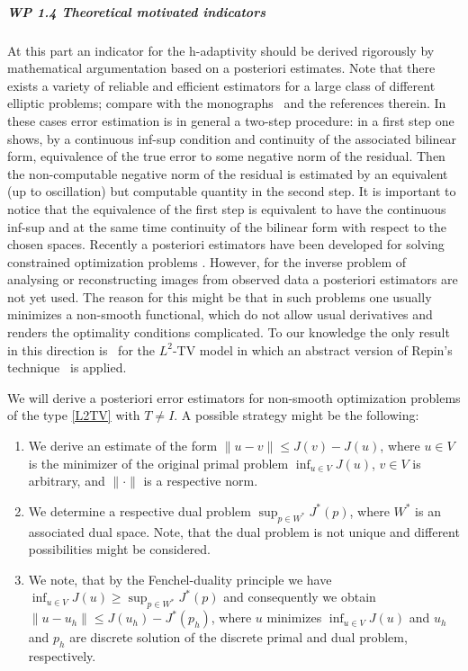 \documentclass[enabledeprecatedfontcommands,cleardoublepage=empty,headsepline,twoside,11pt,DIV=15,BCOR=12mm,final]{scrartcl}
\begin{document}
 
 \subparagraph{WP 1.4 Theoretical motivated indicators}
 
  At this part an indicator for the h-adaptivity should be derived rigorously by mathematical argumentation based on a posteriori estimates. Note that there exists a variety of reliable and efficient estimators for a large class of different elliptic problems; compare with the monographs~\cite{AinOde,Ciarlet:02,Verfurth:96} and the references therein. In these cases error estimation is in general a two-step procedure: in a first step one shows, by a continuous inf-sup condition and continuity of the associated bilinear form, equivalence of the true error to some negative norm of the residual. Then the non-computable negative norm of the residual is estimated by an equivalent (up to oscillation) but computable quantity in the second step. It is important to notice that the equivalence of the first step is equivalent to have the continuous inf-sup and at the same time continuity of the bilinear form with respect to the chosen spaces. Recently a posteriori estimators have been developed for solving constrained optimization problems \cite{KoRoSi:14}. However, for the inverse problem of analysing or reconstructing images from observed data a posteriori estimators are not yet used. The reason for this might be that in such problems one usually minimizes a non-smooth functional, which do not allow usual derivatives and renders the optimality conditions complicated. To our knowledge the only result in this direction is~\cite{Bar2015} for the $L^2$-TV model in which an abstract version of Repin's technique~\cite{Repin} is applied.
 
 We will derive a posteriori error estimators for non-smooth optimization problems of the type \eqref{L2TV} with $T\not= I$. A possible strategy might be the following: 
\begin{enumerate}[1.]
\item We derive an estimate of the form $\|u -v \| \leq J(v) - J(u)$, where $u\in V$ is the minimizer of the original primal problem $\inf_{u\in V} J(u)$, $v\in V$ is arbitrary, and $\|\cdot\|$ is a respective norm.
\item We determine a respective dual problem $\sup_{p\in W^*} J^*(p)$, where $W^*$ is an associated dual space. Note, that the dual problem is not unique and different possibilities might be considered. %
\item We note, that by the Fenchel-duality principle we have $\inf_{u\in V} J(u)\geq \sup_{p\in W^*} J^*(p)$ and consequently we obtain $\|u -u_h \| \leq J(u_h) - J^*(p_h)$, where $u$ minimizes  $\inf_{u\in V} J(u)$ and $u_h$ and $p_h$ are discrete solution of the discrete primal and dual problem, respectively. 
\end{enumerate} 
\end{document}
